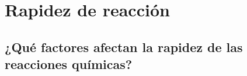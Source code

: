 \newpage \thispagestyle{plain}
\section{Rapidez de reacción}
\subsection{¿Qué factores afectan la rapidez de las reacciones químicas?}




